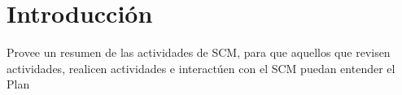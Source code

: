 \chapter{Introducci\'on}
\label{intro}


Provee un resumen de las actividades de SCM, para que aquellos que revisen actividades, 
realicen actividades e interactúen con el SCM puedan entender el Plan


\cleardoublepage